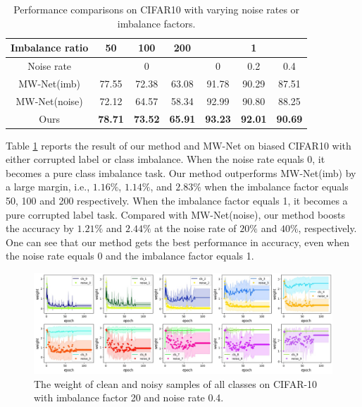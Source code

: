 \documentclass[letterpaper]{article} %
\begin{document}
\begin{table}[t]
\begin{center}
\begin{adjustbox}{max width=0.47\textwidth}
    \begin{tabular}{c|c|c|c|c|c|c}
    \hline
    Imbalance ratio & 50    & 100   & 200   & \multicolumn{3}{c}{1} \\
    \hline
    Noise rate & \multicolumn{3}{c|}{0} & 0     & 0.2   & 0.4 \\
    \hline
    MW-Net(imb) & 77.55 & 72.38 & 63.08 & 91.78 & 90.29 & 87.51 \\
    MW-Net(noise) & 72.12  & 64.57  & 58.34  & 92.99  & 90.80  & 88.25  \\
    Ours  & \textbf{78.71} & \textbf{73.52} & \textbf{65.91} & \textbf{93.23} & \textbf{92.01} & \textbf{90.69} \\
    \hline
    \end{tabular}%
\end{adjustbox}
\vspace{-0.3cm}
\caption{Performance comparisons on CIFAR10 with varying noise rates or imbalance factors.
}
\label{tab:cifar10_res_d}
\vspace{-0.8cm}
\end{center}
\end{table}

Table \ref{tab:cifar10_res_d} reports the result of our method and MW-Net on biased CIFAR10 with either corrupted label or class imbalance.
When the noise rate equals 0, it becomes a pure class imbalance task. 
Our method outperforms MW-Net(imb) by a large margin, i.e., $1.16\%$, $1.14\%$, and $2.83\%$ when the imbalance factor equals 50, 100 and 200 respectively.
When the imbalance factor equals 1, it becomes a pure corrupted label task. 
Compared with MW-Net(noise), our method boosts the accuracy by $1.21\%$ and $2.44\%$ at the noise rate of $20\%$ and $40\%$, respectively.
One can see that our method gets the best performance in accuracy, even when the noise rate equals 0 and the imbalance factor equals 1.


\begin{figure}[h]
\begin{center}
   \includegraphics[width=0.95\linewidth]{figs/cor0.4_imb0.05.jpg}
\end{center}
\vspace{-0.50cm} 
   \caption{
   The weight of clean and noisy samples of all classes on CIFAR-10 with imbalance factor 20 and noise rate 0.4.}
\label{fig:side:weightinclass}
\vspace{-0.50cm} 
\end{figure}
\end{document}
